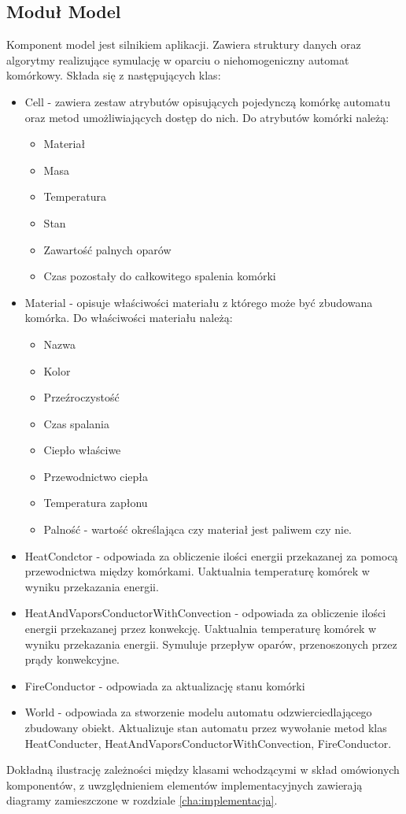 \subsection {Moduł Model}
Komponent model jest silnikiem aplikacji. Zawiera struktury danych oraz algorytmy realizujące symulację w oparciu o niehomogeniczny automat komórkowy. Składa się z następujących klas:
\begin {itemize}
\item Cell - zawiera zestaw atrybutów opisujących pojedynczą komórkę automatu oraz metod umożliwiających dostęp do nich. Do atrybutów komórki należą:
\begin {itemize}
\item Materiał
\item Masa
\item Temperatura
\item Stan
\item Zawartość palnych oparów
\item Czas pozostały do całkowitego spalenia komórki
\end {itemize}
\item Material - opisuje właściwości materiału z którego może być zbudowana komórka.
Do właściwości materiału należą:
\begin {itemize}
\item Nazwa
\item Kolor
\item Przeźroczystość
\item Czas spalania
\item Ciepło właściwe
\item Przewodnictwo ciepła
\item Temperatura zapłonu
\item Palność - wartość określająca czy materiał jest paliwem czy nie.
\end {itemize}
\item HeatCondctor - odpowiada za obliczenie ilości energii przekazanej za pomocą przewodnictwa między komórkami. Uaktualnia temperaturę komórek w wyniku przekazania energii.  
\item HeatAndVaporsConductorWithConvection - odpowiada za obliczenie ilości energii przekazanej przez konwekcję. Uaktualnia temperaturę komórek w wyniku przekazania energii. Symuluje przepływ oparów, przenoszonych przez prądy konwekcyjne.
\item FireConductor - odpowiada za aktualizację stanu komórki
\item World - odpowiada za stworzenie modelu automatu odzwierciedlającego zbudowany obiekt. Aktualizuje stan automatu przez wywołanie metod klas HeatConducter, HeatAndVaporsConductorWithConvection, FireConductor.
\end {itemize}
Dokładną ilustrację zależności między klasami wchodzącymi w skład omówionych komponentów, z uwzględnieniem elementów implementacyjnych zawierają diagramy zamieszczone w rozdziale \ref{cha:implementacja}. %
 
